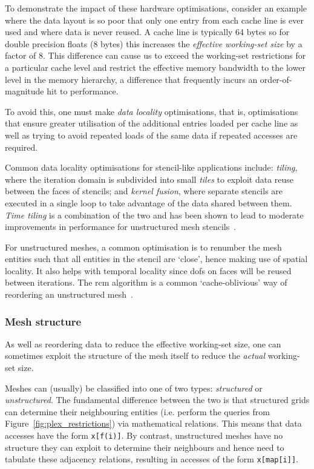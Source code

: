 To demonstrate the impact of these hardware optimisations, consider an example where the data layout is so poor that only one entry from each cache line is ever used and where data is never reused.
A cache line is typically 64 bytes so for double precision floats (8 bytes) this increases the \textit{effective working-set size} by a factor of 8.
This difference can cause us to exceed the working-set restrictions for a particular cache level and restrict the effective memory bandwidth to the lower level in the memory hierarchy, a difference that frequently incurs an order-of-magnitude hit to performance.

To avoid this, one must make \textit{data locality} optimisations, that is, optimisations that ensure greater utilisation of the additional entries loaded per cache line as well as trying to avoid repeated loads of the same data if repeated accesses are required.

Common data locality optimisations for stencil-like applications include: \textit{tiling}, where the iteration domain is subdivided into small \textit{tiles} to exploit data reuse between the faces of stencils; and \textit{kernel fusion}, where separate stencils are executed in a single loop to take advantage of the data shared between them.  %
\textit{Time tiling} is a combination of the two and has been shown to lead to moderate improvements in performance for unstructured mesh stencils~\cite{luporiniAutomatedTilingUnstructured2019}.

For unstructured meshes, a common optimisation is to renumber the mesh entities such that all entities in the stencil are `close', hence making use of spatial locality.
It also helps with temporal locality since \glspl{dof} on faces will be reused between iterations.
The \gls{rcm} algorithm is a common `cache-oblivious' way of reordering an unstructured mesh~\cite{cuthillReducingBandwidthSparse1969,langeEfficientMeshManagement2016}.

\subsubsection{Mesh structure}

As well as reordering data to reduce the effective working-set size, one can sometimes exploit the structure of the mesh itself to reduce the \textit{actual} working-set size.

Meshes can (usually) be classified into one of two types: \textit{structured} or \textit{unstructured}.
The fundamental difference between the two is that structured grids can determine their neighbouring entities (i.e. perform the queries from Figure~\ref{fig:plex_restrictions}) via mathematical relations.
This means that data accesses have the form \texttt{x[f(i)]}.
By contrast, unstructured meshes have no structure they can exploit to determine their neighbours and hence need to tabulate these adjacency relations, resulting in accesses of the form \texttt{x[map[i]]}.

